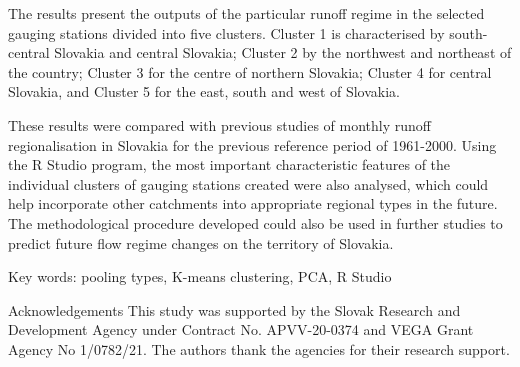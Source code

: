 The results present the outputs of the particular runoff regime in the selected gauging stations divided into five clusters. Cluster 1 is characterised by south-central Slovakia and central Slovakia; Cluster 2 by the northwest and northeast of the country; Cluster 3 for the centre of northern Slovakia; Cluster 4 for central Slovakia, and Cluster 5 for the east, south and west of Slovakia.

These results were compared with previous studies of monthly runoff regionalisation in Slovakia for the previous reference period of 1961-2000. Using the R Studio program, the most important characteristic features of the individual clusters of gauging stations created were also analysed, which could help incorporate other catchments into appropriate regional types in the future. The methodological procedure developed could also be used in further studies to predict future flow regime changes on the territory of Slovakia.

Key words: pooling types, K-means clustering, PCA, R Studio

Acknowledgements 
This study was supported by the Slovak Research and Development Agency under Contract No. APVV-20-0374 and VEGA Grant Agency No 1/0782/21. The authors thank the agencies for their research support.



